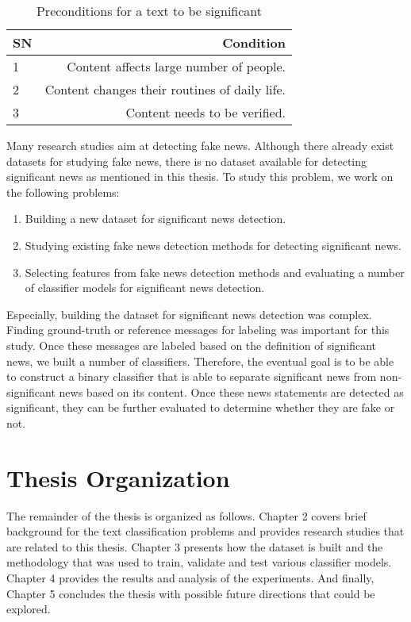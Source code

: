 \begin{table}[h]
\begin{center}
\caption{Preconditions for a text to be significant}
\label{tbl:significant_preconditions}
\begin{tabular}{l | r}
\toprule
SN & Condition \\
\midrule
1 & Content affects large number of people. \\
2 & Content changes their routines of daily life. \\
3 & Content needs to be verified. \\
\bottomrule
\end{tabular}
\end{center}
\end{table}


Many research studies aim at detecting fake news. Although there already exist datasets for studying fake news, there is no dataset available for detecting significant news as mentioned in this thesis. To study this problem, we work on the following problems:

\begin{enumerate}
    \item Building a new dataset for significant news detection.
    \item Studying existing fake news detection methods for detecting significant news.
    \item Selecting features from fake news detection methods and evaluating a number of classifier models for significant news detection.
\end{enumerate}

Especially, building the dataset for significant news detection was complex. Finding ground-truth or reference messages for labeling was important for this study. Once these messages are labeled based on the definition of significant news, we built a number of classifiers. Therefore, the eventual goal is to be able to construct a binary classifier that is able to separate significant news from non-significant news based on its content. Once these news statements are detected as significant, they can be further evaluated to determine whether they are fake or not.

\section{Thesis Organization} \label{intro:organization}
The remainder of the thesis is organized as follows. Chapter 2 covers brief background for the text classification problems and provides research studies that are related to this thesis. Chapter 3 presents how the dataset is built and the methodology that was used to train, validate and test various classifier models. Chapter 4  provides the results and analysis of the experiments. And finally, Chapter 5 concludes the thesis with possible future directions that could be explored.